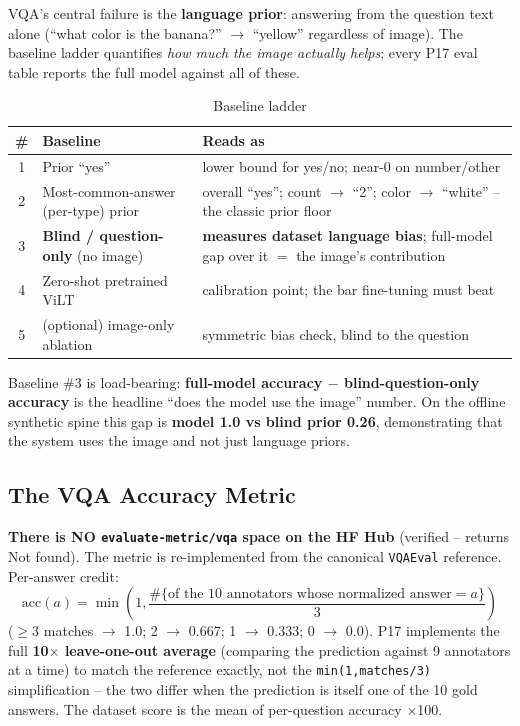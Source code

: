 \documentclass[12pt,a4paper]{article}
\begin{document}
VQA's central failure is the \textbf{language prior}: answering from the question text alone (``what color is the banana?'' $\rightarrow$ ``yellow'' regardless of image). The baseline ladder quantifies \emph{how much the image actually helps}; every P17 eval table reports the full model against all of these.

\begin{table}[H]
\centering
\caption{Baseline ladder}
\small
\begin{tabularx}{\linewidth}{@{} c p{3.6cm} L @{}}
\toprule
\textbf{\#} & \textbf{Baseline} & \textbf{Reads as} \\
 & Prior ``yes'' & lower bound for yes/no; near-0 on number/other \\
2 & Most-common-answer (per-type) prior & overall ``yes''; count $\rightarrow$ ``2''; color $\rightarrow$ ``white'' -- the classic prior floor \\
3 & \textbf{Blind / question-only} (no image) & \textbf{measures dataset language bias}; full-model gap over it $=$ the image's contribution \\
4 & Zero-shot pretrained ViLT & calibration point; the bar fine-tuning must beat \\
5 & (optional) image-only ablation & symmetric bias check, blind to the question \\
\bottomrule
\end{tabularx}
\end{table}

Baseline \#3 is load-bearing: \textbf{full-model accuracy $-$ blind-question-only accuracy} is the headline ``does the model use the image'' number. On the offline synthetic spine this gap is \textbf{model 1.0 vs blind prior 0.26}, demonstrating that the system uses the image and not just language priors.

\subsection{The VQA Accuracy Metric}

\textbf{There is NO \texttt{evaluate-metric/vqa} space on the HF Hub} (verified -- returns Not found). The metric is re-implemented from the canonical \texttt{VQAEval} reference. Per-answer credit:
\[
\mathrm{acc}(a) = \min\!\left(1, \frac{\#\{\text{of the 10 annotators whose normalized answer} = a\}}{3}\right)
\]
($\geq$3 matches $\rightarrow$ 1.0; 2 $\rightarrow$ 0.667; 1 $\rightarrow$ 0.333; 0 $\rightarrow$ 0.0). P17 implements the full \textbf{10$\times$ leave-one-out average} (comparing the prediction against 9 annotators at a time) to match the reference exactly, not the \texttt{min(1,matches/3)} simplification -- the two differ when the prediction is itself one of the 10 gold answers. The dataset score is the mean of per-question accuracy $\times$100.
\end{document}
